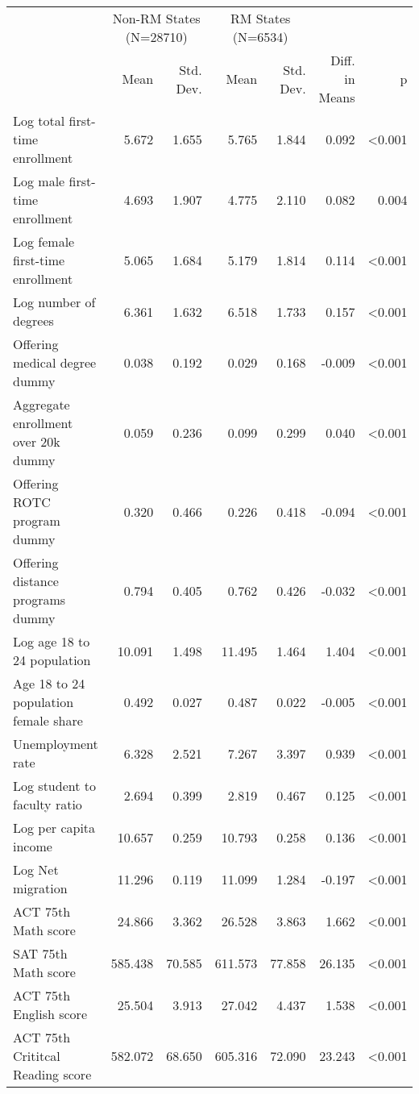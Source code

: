 \begin{table}
\centering
\begin{tabular}[t]{lrrrrrr}
\toprule
\multicolumn{1}{c}{ } & \multicolumn{2}{c}{Non-RM States (N=28710)} & \multicolumn{2}{c}{RM States (N=6534)} & \multicolumn{2}{c}{ } \\
\cmidrule(l{3pt}r{3pt}){2-3} \cmidrule(l{3pt}r{3pt}){4-5}
  & Mean & Std. Dev. & Mean & Std. Dev. & Diff. in Means & p\\
\midrule
Log total first-time enrollment & 5.672 & 1.655 & 5.765 & 1.844 & 0.092 & <0.001\\
Log male first-time enrollment & 4.693 & 1.907 & 4.775 & 2.110 & 0.082 & 0.004\\
Log female first-time enrollment & 5.065 & 1.684 & 5.179 & 1.814 & 0.114 & <0.001\\
Log number of degrees & 6.361 & 1.632 & 6.518 & 1.733 & 0.157 & <0.001\\
Offering medical degree dummy & 0.038 & 0.192 & 0.029 & 0.168 & -0.009 & <0.001\\
Aggregate enrollment over 20k dummy & 0.059 & 0.236 & 0.099 & 0.299 & 0.040 & <0.001\\
Offering ROTC program dummy & 0.320 & 0.466 & 0.226 & 0.418 & -0.094 & <0.001\\
Offering distance programs dummy & 0.794 & 0.405 & 0.762 & 0.426 & -0.032 & <0.001\\
Log age 18 to 24 population & 10.091 & 1.498 & 11.495 & 1.464 & 1.404 & <0.001\\
Age 18 to 24 population female share & 0.492 & 0.027 & 0.487 & 0.022 & -0.005 & <0.001\\
Unemployment rate & 6.328 & 2.521 & 7.267 & 3.397 & 0.939 & <0.001\\
Log student to faculty ratio & 2.694 & 0.399 & 2.819 & 0.467 & 0.125 & <0.001\\
Log per capita income & 10.657 & 0.259 & 10.793 & 0.258 & 0.136 & <0.001\\
Log Net migration & 11.296 & 0.119 & 11.099 & 1.284 & -0.197 & <0.001\\
ACT 75th Math score & 24.866 & 3.362 & 26.528 & 3.863 & 1.662 & <0.001\\
SAT 75th Math score & 585.438 & 70.585 & 611.573 & 77.858 & 26.135 & <0.001\\
ACT 75th English score & 25.504 & 3.913 & 27.042 & 4.437 & 1.538 & <0.001\\
ACT 75th Crititcal Reading score & 582.072 & 68.650 & 605.316 & 72.090 & 23.243 & <0.001\\

\end{tabular}
\end{table}
